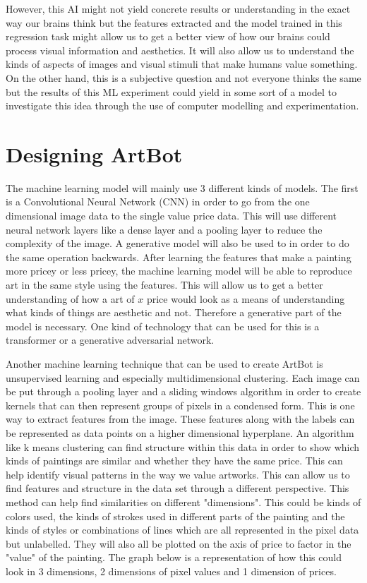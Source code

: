 \documentclass{article}
\begin{document}
However, this AI might not yield concrete results or understanding in the exact way our brains think but the features extracted and the model trained in this regression task might allow us to get a better view of how our brains could process visual information and aesthetics. It will also allow us to understand the kinds of aspects of images and visual stimuli that make humans value something. On the other hand, this is a subjective question and not everyone thinks the same but the results of this ML experiment could yield in some sort of a model to investigate this idea through the use of computer modelling and experimentation. 

\section{Designing ArtBot}

The machine learning model will mainly use 3 different kinds of models. The first is a Convolutional Neural Network (CNN) in order to go from the one dimensional image data to the single value price data. This will use different neural network layers like a dense layer and a pooling layer to reduce the complexity of the image. A generative model will also be used to in order to do the same operation backwards. After learning the features that make a painting more pricey or less pricey, the machine learning model will be able to reproduce art in the same style using the features. This will allow us to get a better understanding of how a art of $x$ price would look as a means of understanding what kinds of things are aesthetic and not. Therefore a generative part of the model is necessary. One kind of technology that can be used for this is a transformer or a generative adversarial network. \newline 

Another machine learning technique that can be used to create ArtBot is unsupervised learning and especially multidimensional clustering. Each image can be put through a pooling layer and a sliding windows algorithm in order to create kernels that can then represent groups of pixels in a condensed form. This is one way to extract features from the image. These features along with the labels can be represented as data points on a higher dimensional hyperplane. An algorithm like k means clustering can find structure within this data in order to show which kinds of paintings are similar and whether they have the same price. This can help identify visual patterns in the way we value artworks. This can allow us to find features and structure in the data set through a different perspective. This method can help find similarities on different "dimensions". This could be kinds of colors used, the kinds of strokes used in different parts of the painting and the kinds of styles or combinations of lines which are all represented in the pixel data but unlabelled. They will also all be plotted on the axis of price to factor in the "value" of the painting. The graph below is a representation of how this could look in 3 dimensions, 2 dimensions of pixel values and 1 dimension of prices. \newline
\end{document}
